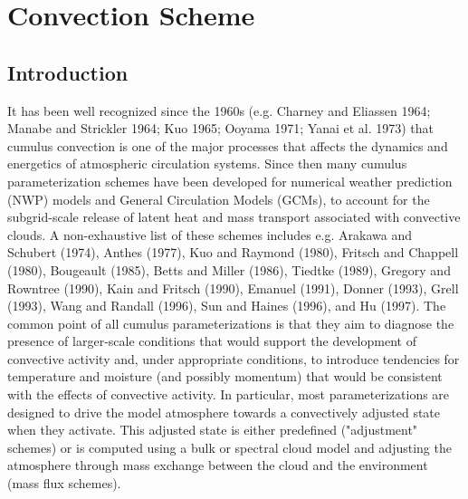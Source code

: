 %
%
%
%
%
%
\chapter{Convection Scheme}
\minitoc
\section{Introduction}

It has been  well recognized since the 1960s (e.g.
Charney and Eliassen 1964; Manabe and Strickler 1964; Kuo 1965;
Ooyama 1971; Yanai et al. 1973) that cumulus convection
is one of the major processes that affects the dynamics and energetics
of  atmospheric circulation systems.
Since then many cumulus parameterization schemes
 have been developed for numerical weather prediction (NWP) models and
General Circulation Models (GCMs), to account for
the subgrid-scale release of latent heat and mass transport associated
with convective clouds. A non-exhaustive list of these schemes includes e.g.
Arakawa and Schubert (1974), Anthes (1977), Kuo and Raymond (1980),
Fritsch and Chappell (1980),
Bougeault (1985), Betts and Miller (1986),
Tiedtke (1989), Gregory and Rowntree (1990), Kain and Fritsch (1990),
Emanuel (1991), Donner (1993), Grell (1993),
Wang and Randall (1996), Sun and Haines (1996), and Hu (1997).
The common point of all cumulus parameterizations is that they aim to diagnose the
presence of larger-scale conditions that would support the development of
convective activity and, under appropriate conditions, to introduce tendencies
for temperature and moisture (and possibly momentum) that would be consistent
with the effects of convective activity.  In particular, most parameterizations are
designed to drive the model atmosphere towards a convectively adjusted state
when they activate.  This adjusted state is either predefined ("adjustment"
schemes) or is computed using a bulk or spectral cloud model
and adjusting the atmosphere through mass exchange between the cloud
and the environment (mass flux schemes).

